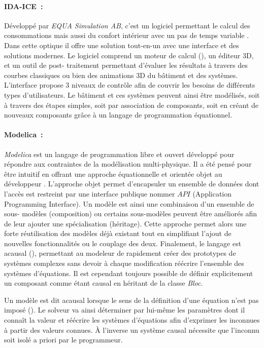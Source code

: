 \paragraph{IDA-ICE~:} %
\label{par:ida_ice}
Développé par \textit{EQUA Simulation AB}, c’est un logiciel permettant le calcul des
consommations mais aussi du confort intérieur avec un pas de temps variable
\parencite{Kalamees2004}. Dans cette optique il offre une solution tout-en-un avec une
interface et des solutions modernes. Le logiciel comprend un moteur de calcul (),
un éditeur $3$D, et un outil de post- traitement permettant d’évaluer les résultats à
travers des courbes classiques ou bien des animations $3$D du bâtiment et des systèmes.
L’interface propose $3$ niveaux de contrôle afin de couvrir les besoins de différents
types d’utilisateurs. Le bâtiment et ces systèmes peuvent ainsi être modélisés, soit à
travers des étapes simples, soit par association de composants, soit en créant de nouveaux
composants grâce à un langage de programmation équationnel.

\paragraph{Modelica~:} %
\label{par:modelica_}
\textit{Modelica} est un langage de programmation libre et ouvert
développé pour répondre aux contraintes de la modélisation multi-physique. Il a été pensé
pour être intuitif en offrant une approche équationnelle et orientée objet au développeur
\parencite{Wetter2016290}.
L’approche objet permet d’encapsuler un ensemble de données dont l’accès est restreint par
une interface publique nommer $API$ (Application Programming Interface). Un modèle est
ainsi une combinaison d’un ensemble de sous- modèles (composition) ou certains sous-modèles
peuvent être améliorés afin de leur ajouter une spécialisation (héritage). Cette
approche permet alors une forte réutilisation des modèles déjà existant tout en
simplifiant l’ajout de nouvelles fonctionnalités ou le couplage des deux. Finalement, le
langage est acausal (), permettant au modeleur de rapidement
créer des prototypes de systèmes complexes sans devoir à chaque modification réécrire
l’ensemble des systèmes d’équations. Il est cependant toujours possible de définir
explicitement un composant comme étant causal en héritant de la classe \textit{Bloc}.

\begin{Def}[Acausal]\label{def:acausal}
Un modèle est dit acausal lorsque le sens de la définition d’une équation n’est pas
imposé (). Le solveur va ainsi déterminer par lui-même les
paramètres dont il connaît la valeur et réécrire les systèmes d’équations afin d’exprimer
les inconnues à partir des valeurs connues. À l’inverse un système causal nécessite
que l’inconnu soit isolé a priori par le programmeur.
\end{Def}

